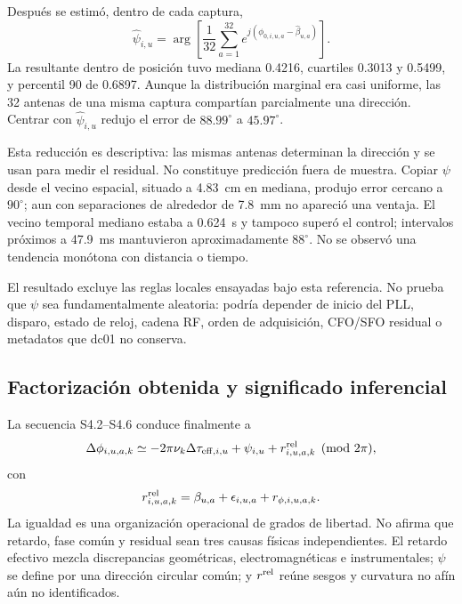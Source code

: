 Después se estimó, dentro de cada captura,
\begin{equation}
\widehat\psi_{i,u}=\arg\!\left[
\frac{1}{32}\sum_{a=1}^{32}
e^{j(\phi_{0,i,u,a}-\widehat\beta_{u,a})}
\right].
\label{eq:common_array_phase_estimator}
\end{equation}
La resultante dentro de posición tuvo mediana 0.4216, cuartiles 0.3013 y 0.5499,
y percentil 90 de 0.6897. Aunque la distribución marginal era casi uniforme, las
32 antenas de una misma captura compartían parcialmente una dirección. Centrar con
$\widehat\psi_{i,u}$ redujo el error de $88.99^\circ$ a $45.97^\circ$.

Esta reducción es descriptiva: las mismas antenas determinan la dirección y se usan
para medir el residual. No constituye predicción fuera de muestra. Copiar $\psi$
desde el vecino espacial, situado a \SI{4.83}{cm} en mediana, produjo error cercano
a $90^\circ$; aun con separaciones de alrededor de \SI{7.8}{mm} no apareció una
ventaja. El vecino temporal mediano estaba a \SI{0.624}{s} y tampoco superó el
control; intervalos próximos a \SI{47.9}{ms} mantuvieron aproximadamente
$88^\circ$. No se observó una tendencia monótona con distancia o tiempo.

El resultado excluye las reglas locales ensayadas bajo esta referencia. No prueba
que $\psi$ sea fundamentalmente aleatoria: podría depender de inicio del PLL,
disparo, estado de reloj, cadena RF, orden de adquisición, CFO/SFO residual o
metadatos que dc01 no conserva.

\subsection{Factorización obtenida y significado inferencial}

La secuencia S4.2--S4.6 conduce finalmente a
\begin{equation}
\Delta\phi_{i,u,a,k}\simeq
-2\pi\nu_k\Delta\tau_{{\rm eff},i,u}
+\psi_{i,u}+r^{\rm rel}_{i,u,a,k}\pmod{2\pi},
\label{eq:phase_contribution_factorization}
\end{equation}
con
\begin{equation}
r^{\rm rel}_{i,u,a,k}=
\beta_{u,a}+\epsilon_{i,u,a}+r_{\phi,i,u,a,k}.
\label{eq:relative_residual_composition}
\end{equation}
La igualdad es una organización operacional de grados de libertad. No afirma que
retardo, fase común y residual sean tres causas físicas independientes. El retardo
efectivo mezcla discrepancias geométricas, electromagnéticas e instrumentales;
$\psi$ se define por una dirección circular común; y $r^{\rm rel}$ reúne sesgos y
curvatura no afín aún no identificados.

